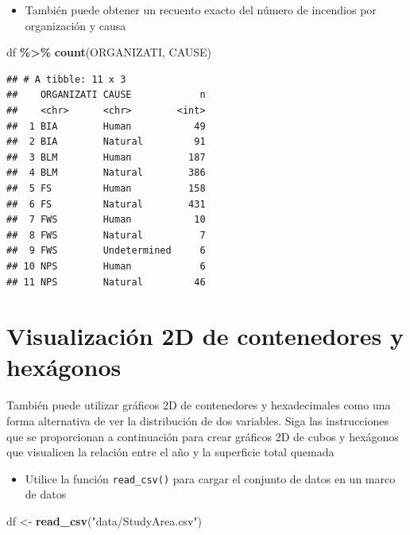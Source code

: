 \documentclass[
]{book}
\newenvironment{Shaded}{\begin{snugshade}}{\end{snugshade}}
\newcommand{\FunctionTok}[1]{\textcolor[rgb]{0.13,0.29,0.53}{\textbf{#1}}}
\newcommand{\NormalTok}[1]{#1}
\newcommand{\OtherTok}[1]{\textcolor[rgb]{0.56,0.35,0.01}{#1}}
\newcommand{\SpecialCharTok}[1]{\textcolor[rgb]{0.81,0.36,0.00}{\textbf{#1}}}
\newcommand{\StringTok}[1]{\textcolor[rgb]{0.31,0.60,0.02}{#1}}
\providecommand{\tightlist}{%
  \setlength{\itemsep}{0pt}\setlength{\parskip}{0pt}}
\begin{document}
\begin{itemize}
\tightlist
\item
  También puede obtener un recuento exacto del número de incendios por organización y causa
\end{itemize}

\begin{Shaded}
\begin{Highlighting}[]
\NormalTok{df }\SpecialCharTok{\%\textgreater{}\%}
  \FunctionTok{count}\NormalTok{(ORGANIZATI, CAUSE)}
\end{Highlighting}
\end{Shaded}

\begin{verbatim}
## # A tibble: 11 x 3
##    ORGANIZATI CAUSE            n
##    <chr>      <chr>        <int>
##  1 BIA        Human           49
##  2 BIA        Natural         91
##  3 BLM        Human          187
##  4 BLM        Natural        386
##  5 FS         Human          158
##  6 FS         Natural        431
##  7 FWS        Human           10
##  8 FWS        Natural          7
##  9 FWS        Undetermined     6
## 10 NPS        Human            6
## 11 NPS        Natural         46
\end{verbatim}

\section{Visualización 2D de contenedores y hexágonos}\label{visualizaciuxf3n-2d-de-contenedores-y-hexuxe1gonos}

También puede utilizar gráficos 2D de contenedores y hexadecimales como una forma alternativa de ver la distribución de dos variables. Siga las instrucciones que se proporcionan a continuación para crear gráficos 2D de cubos y hexágonos que visualicen la relación entre el año y la superficie total quemada

\begin{itemize}
\tightlist
\item
  Utilice la función \texttt{read\_csv()} para cargar el conjunto de datos en un marco de datos
\end{itemize}

\begin{Shaded}
\begin{Highlighting}[]
\NormalTok{df }\OtherTok{\textless{}{-}} \FunctionTok{read\_csv}\NormalTok{(}\StringTok{"data/StudyArea.csv"}\NormalTok{)}
\end{Highlighting}
\end{Shaded}
\end{document}
